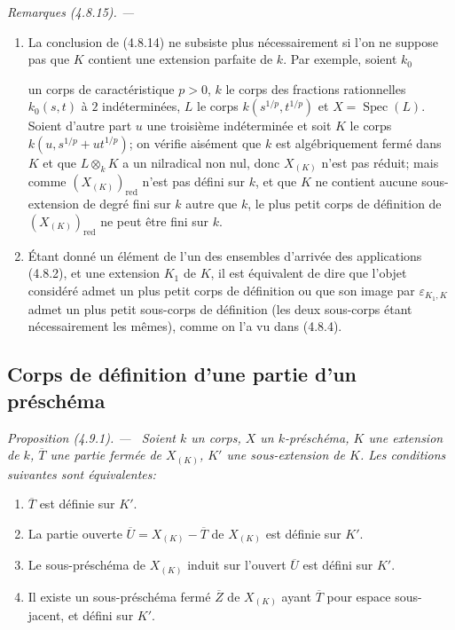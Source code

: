 \documentclass[10pt,oneside]{book}
\newcommand{\oldpage}[2][]{%
  \setcounter{footnote}{0}%
  \marginpar{\scriptsize\textbf{#1}~|~#2}\ignorespaces}
\newenvironment{proposition}[1][]{%
  \par\medskip\noindent\itshape Proposition (#1). ---\ }{\par}
\newenvironment{remarks}[1][]{%
  \par\medskip\noindent\itshape Remarques (#1). ---\ }{\par}
\begin{document}
\begin{remarks}[4.8.15]
\label{IV.2.4.8.15-fr}
\begin{enumerate}
\item[(i)] La conclusion de (4.8.14) ne subsiste plus nécessairement si l'on
ne suppose pas que $K$ contient une extension parfaite de $k$. Par exemple,
soient $k_0$

\oldpage[IV-2]{84}

un corps de caractéristique $p>0$, $k$ le corps des fractions
rationnelles $k_0(s,t)$ à $2$ indéterminées, $L$ le corps
$k(s^{1/p},t^{1/p})$ et $X=\operatorname{Spec}(L)$. Soient d'autre part $u$
une troisième indéterminée et soit $K$ le corps
$k(u,s^{1/p}+ut^{1/p})$; on vérifie aisément que $k$ est algébriquement fermé
dans $K$ et que $L\otimes_kK$ a un nilradical non nul, donc $X_{(K)}$ n'est
pas réduit; mais comme $(X_{(K)})_{\mathrm{red}}$ n'est pas défini sur $k$,
et que $K$ ne contient aucune sous-extension de degré fini sur $k$ autre que
$k$, le plus petit corps de définition de $(X_{(K)})_{\mathrm{red}}$ ne peut
être fini sur $k$.

\item[(ii)] Étant donné un élément de l'un des ensembles d'arrivée des
applications (4.8.2), et une extension $K_1$ de $K$, il est équivalent de dire
que l'objet considéré admet un plus petit corps de définition ou que son image
par $\varepsilon_{K_1,K}$ admet un plus petit sous-corps de définition (les
deux sous-corps étant nécessairement les mêmes), comme on l'a vu dans
(4.8.4).
\end{enumerate}
\end{remarks}
\subsection{Corps de définition d'une partie d'un préschéma}

\begin{proposition}[4.9.1]
\label{IV.2.4.9.1-fr}
Soient $k$ un corps, $X$ un $k$-préschéma, $K$ une extension de $k$,
$\overline T$ une partie fermée de $X_{(K)}$, $K'$ une sous-extension de $K$.
Les conditions suivantes sont équivalentes:
\begin{enumerate}
\item[a)] $\overline T$ est définie sur $K'$.
\item[b)] La partie ouverte $\overline U=X_{(K)}-\overline T$ de $X_{(K)}$
est définie sur $K'$.
\item[b')] Le sous-préschéma de $X_{(K)}$ induit sur l'ouvert $\overline U$
est défini sur $K'$.
\item[c)] Il existe un sous-préschéma fermé $\overline Z$ de $X_{(K)}$ ayant
$\overline T$ pour espace sous-jacent, et défini sur $K'$.
\end{enumerate}
\end{proposition}
\end{document}
